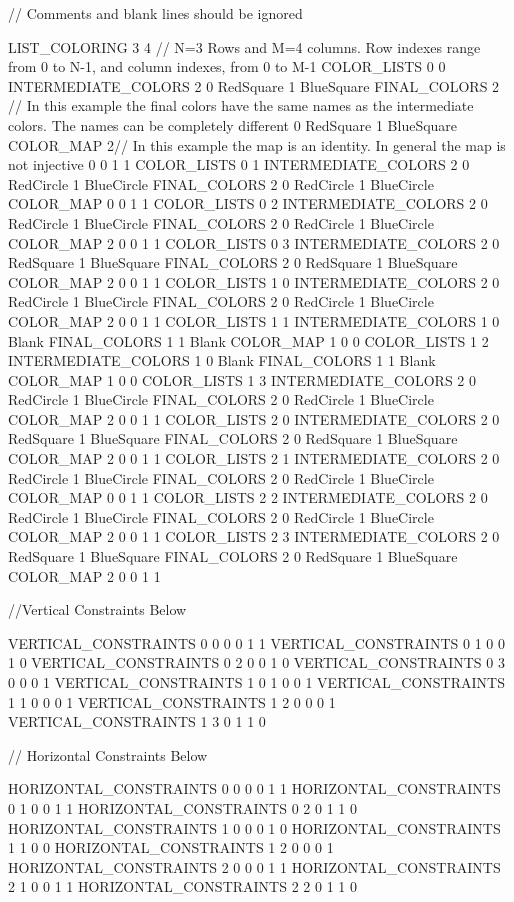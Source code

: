 // Comments and blank lines should be ignored


LIST_COLORING  3 4 // N=3 Rows and M=4 columns. Row indexes range from 0 to N-1, and column indexes, from 0 to M-1
COLOR_LISTS 0 0 
INTERMEDIATE_COLORS 2
0 RedSquare
1 BlueSquare 
FINAL_COLORS 2 // In this example the final colors have the same names as the intermediate colors. The names can be completely different
0 RedSquare
1 BlueSquare 
COLOR_MAP 2// In this example the map is an identity. In general the map is not injective
0 0
1 1 
COLOR_LISTS 0 1 
INTERMEDIATE_COLORS 2
0 RedCircle
1 BlueCircle
FINAL_COLORS 2
0 RedCircle
1 BlueCircle
COLOR_MAP 
0 0
1 1
COLOR_LISTS 0 2 
INTERMEDIATE_COLORS 2
0 RedCircle
1 BlueCircle
FINAL_COLORS 2
0 RedCircle
1 BlueCircle
COLOR_MAP 2
0 0
1 1
COLOR_LISTS 0 3 
INTERMEDIATE_COLORS 2
0 RedSquare
1 BlueSquare 
FINAL_COLORS 2 
0 RedSquare
1 BlueSquare 
COLOR_MAP 2 
0 0
1 1 
COLOR_LISTS 1 0
INTERMEDIATE_COLORS 2
0 RedCircle
1 BlueCircle
FINAL_COLORS 2
0 RedCircle
1 BlueCircle
COLOR_MAP 2
0 0
1 1
COLOR_LISTS 1 1 
INTERMEDIATE_COLORS 1
0 Blank 
FINAL_COLORS 1
1 Blank
COLOR_MAP 1
0 0
COLOR_LISTS 1 2 
INTERMEDIATE_COLORS 1
0 Blank 
FINAL_COLORS 1
1 Blank
COLOR_MAP 1
0 0
COLOR_LISTS 1 3
INTERMEDIATE_COLORS 2
0 RedCircle
1 BlueCircle
FINAL_COLORS 2
0 RedCircle
1 BlueCircle
COLOR_MAP 2
0 0
1 1
COLOR_LISTS 2 0 
INTERMEDIATE_COLORS 2
0 RedSquare
1 BlueSquare 
FINAL_COLORS 2 
0 RedSquare
1 BlueSquare 
COLOR_MAP 2
0 0
1 1 
COLOR_LISTS 2 1 
INTERMEDIATE_COLORS 2
0 RedCircle
1 BlueCircle
FINAL_COLORS 2
0 RedCircle
1 BlueCircle
COLOR_MAP 
0 0
1 1
COLOR_LISTS 2 2 
INTERMEDIATE_COLORS 2
0 RedCircle
1 BlueCircle
FINAL_COLORS 2
0 RedCircle
1 BlueCircle
COLOR_MAP 2
0 0
1 1
COLOR_LISTS 2 3 
INTERMEDIATE_COLORS 2
0 RedSquare
1 BlueSquare 
FINAL_COLORS 2 
0 RedSquare
1 BlueSquare 
COLOR_MAP 2 
0 0
1 1 

//Vertical Constraints Below


VERTICAL_CONSTRAINTS 0 0
0 0
1 1
VERTICAL_CONSTRAINTS 0 1
0 0
1 0
VERTICAL_CONSTRAINTS 0 2
0 0
1 0
VERTICAL_CONSTRAINTS 0 3
0 0
0 1
VERTICAL_CONSTRAINTS 1 0
1 0
0 1
VERTICAL_CONSTRAINTS 1 1
0 0
0 1
VERTICAL_CONSTRAINTS 1 2
0 0
0 1
VERTICAL_CONSTRAINTS 1 3
0 1
1 0


// Horizontal Constraints Below


HORIZONTAL_CONSTRAINTS 0 0
0 0
1 1
HORIZONTAL_CONSTRAINTS 0 1
0 0
1 1
HORIZONTAL_CONSTRAINTS 0 2
0 1
1 0
HORIZONTAL_CONSTRAINTS 1 0
0 0
1 0
HORIZONTAL_CONSTRAINTS 1 1
0 0
HORIZONTAL_CONSTRAINTS 1 2
0 0
0 1
HORIZONTAL_CONSTRAINTS 2 0
0 0
1 1
HORIZONTAL_CONSTRAINTS 2 1
0 0
1 1
HORIZONTAL_CONSTRAINTS 2 2
0 1
1 0
